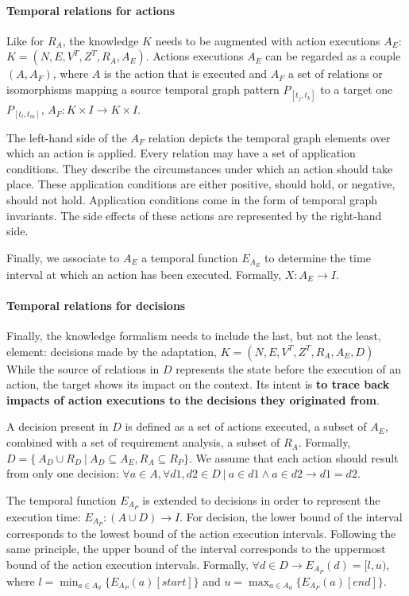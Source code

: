 \paragraph{Temporal relations for actions}
Like for $R_A$, the knowledge $K$ needs to be augmented with action executions $A_E$: $K = (N, E, V^T, Z^T, R_A, A_E)$.
Actions executions $A_E$ can be regarded as a couple $(A, A_F)$, where $A$ is the action that is executed and $A_F$ a set of relations or isomorphisms mapping a source temporal graph pattern $P_{[t_j, t_k]}$ to a target one $P_{[t_l, t_m]}$,  $A_F : K \times I \rightarrow K \times I$.

The left-hand side of the $A_F$ relation depicts the temporal graph elements over which an action is applied.
Every relation may have a set of application conditions. 
They describe the circumstances under which an action should take place. 
These application conditions are either positive, should hold, or negative, should not hold. 
Application conditions come in the form of temporal graph invariants.  
The side effects of these actions are represented by the right-hand side. 

Finally, we associate to $A_E$ a temporal function $E_{A_E}$ to determine the time interval at which an action has been executed. 
Formally, $X: A_E \rightarrow I$.

\paragraph{Temporal relations for decisions}
Finally, the knowledge formalism needs to include the last, but not the least, element: decisions made by the adaptation, $K = (N, E, V^T, Z^T, R_A, A_E, D)$
While the source of relations in $D$ represents the state before the execution of an action, the target shows its impact on the \gls{context}. 
Its intent is \textbf{to trace back impacts of action executions to the decisions they originated from}.  

A decision present in ${D}$ is defined as a set of actions executed, \ie a subset of ${A_E}$, combined with a set of requirement analysis, \ie a subset of ${R_A}$.
Formally, ${D} = \{\ {A_D \cup R_D}~|~{A_D}  \subseteq A_E, R_A \subseteq R_P\}$.
We assume that each action should result from only one decision: $\forall a \in {A}, \forall d1, d2 \in {D}~|~a \in d1 \wedge a \in d2 \rightarrow d1 = d2$.

The temporal function $E_{A_P}$ is extended to decisions in order to represent the execution time: $E_{A_P}: (A \cup D) \rightarrow I$.
For decision, the lower bound of the interval corresponds to the lowest bound of the action execution intervals.
Following the same principle, the upper bound of the interval corresponds to the uppermost bound of the action execution intervals.
Formally, $\forall d \in D \rightarrow E_{A_P}(d) = [l,u)$, where $l = \displaystyle \min_{a \in A_d} \{E_{A_P}(a)[start]\}$ and $u = \displaystyle \max_{a \in A_d} \{E_{A_P}(a)[end]\}$.

